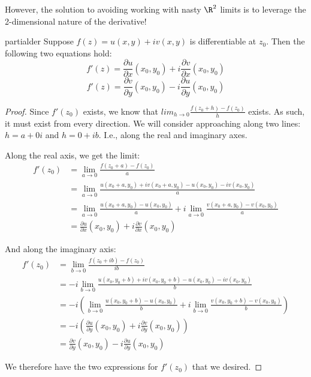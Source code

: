 However, the solution to avoiding working with nasty $\R^2$ limits is to leverage the 2-dimensional nature of the derivative!

\begin{thmbo}{}{partialder} Suppose $f(z) = u(x,y) + iv(x,y)$ is differentiable at $z_0$. Then the following two equations hold:
$$f'(z) = \frac{\partial u}{\partial x}(x_0,y_0) + i\frac{\partial v}{\partial x}(x_0,y_0)$$
$$f'(z) = \frac{\partial v}{\partial y}(x_0,y_0) - i\frac{\partial u}{\partial y}(x_0,y_0)$$
\end{thmbo}

\begin{proof} Since $f'(z_0)$ exists, we know that $lim_{h\rightarrow 0} \frac{f(z_0 + h) - f(z_0)}{h}$ exists. As such, it must exist from every direction. We will consider approaching along two lines: $h = a + 0i$ and $h = 0 + ib$. I.e., along the real and imaginary axes.

Along the real axis, we get the limit:
\begin{align*}f'(z_0) &= \lim_{a\rightarrow 0} \frac{f(z_0 + a) - f(z_0)}{a}\\
&= \lim_{a\rightarrow 0} \frac{u(x_0+a,y_0) + iv(x_0 + a, y_0) - u(x_0,y_0) - iv(x_0,y_0)}{a}\\
&=\lim_{a\rightarrow 0} \frac{u(x_0+a,y_0) - u(x_0,y_0)}{a} + i\lim_{a\rightarrow 0} \frac{v(x_0 + a, y_0) -v(x_0,y_0)}{a}\\
&= \frac{\partial u}{\partial x}(x_0,y_0) + i\frac{\partial v}{\partial x}(x_0,y_0)
\end{align*}

And along the imaginary axis: 
\begin{align*}f'(z_0) &= \lim_{b\rightarrow 0} \frac{f(z_0 + ib) - f(z_0)}{ib}\\
&= -i\lim_{b\rightarrow 0} \frac{u(x_0,y_0+b) + iv(x_0, y_0+b) - u(x_0,y_0) - iv(x_0,y_0)}{b}\\
&=-i\left(\lim_{b\rightarrow 0} \frac{u(x_0,y_0+b) - u(x_0,y_0)}{b} + i\lim_{b\rightarrow 0} \frac{v(x_0, y_0+b) -v(x_0,y_0)}{b}\right)\\
&= -i\left(\frac{\partial u}{\partial y}(x_0,y_0) + i\frac{\partial v}{\partial y}(x_0,y_0)\right)\\
&=\frac{\partial v}{\partial y}(x_0,y_0) - i\frac{\partial u}{\partial y}(x_0,y_0)
\end{align*}

We therefore have the two expressions for $f'(z_0)$ that we desired.
\end{proof}

